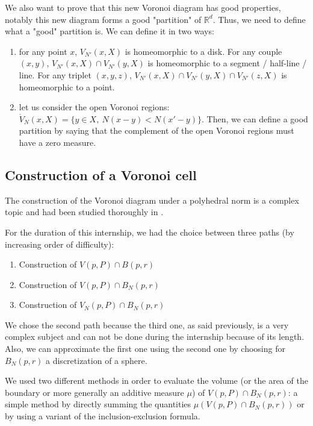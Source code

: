 We also want to prove that this new Voronoi diagram has good properties, notably
this new diagram forms a good "partition" of $ \mathbb{R}^d $. Thus, we need to
define what a "good" partition is.
We can define it in two ways:
\begin{enumerate}
    \item for any point $ x $, $ V_{N'}(x, X) $ is homeomorphic to a disk. For
        any couple $ (x, y) $, $ V_{N'}(x, X) \cap V_{N'}(y, X) $ is
        homeomorphic to a segment / half-line / line. For any triplet $ (x, y,
        z) $, $ V_{N'}(x, X) \cap V_{N'}(y, X) \cap V_{N'}(z, X) $ is
        homeomorphic to a point.
    \item let us consider the open Voronoi regions: $ \ocirc{V}_N(x, X) = \{ y
        \in X,~ N(x - y) < N(x' - y)\} $. Then, we can define a good partition
        by saying that the complement of the open Voronoi regions must have a
        zero measure.
\end{enumerate}

\subsection{Construction of a Voronoi cell}

The construction of the Voronoi diagram under a polyhedral norm is a complex
topic and had been studied thoroughly in \cite{ma2000bisectors}.

For the duration of this internship, we had the choice between three paths
(by increasing order of difficulty):
\begin{enumerate}
    \item Construction of $ V(p, P) \cap B(p, r) $
    \item Construction of $ V(p, P) \cap B_N(p, r) $
    \item Construction of $ V_N(p, P) \cap B_N(p, r) $
\end{enumerate}

We chose the second path because the third one, as said previously, is a very
complex subject and can not be done during the internship because of its length.
Also, we can approximate the first one using the second one by choosing for $
B_N(p, r) $ a discretization of a sphere.

We used two different methods in order to evaluate the volume (or the area of
the boundary or more generally an additive measure $ \mu $) of $ V(p, P) \cap
B_N(p, r) $: a simple method by directly summing the quantities $ \mu(V(p, P)
\cap B_N(p, r)) $ or by using a variant of the inclusion-exclusion formula.

